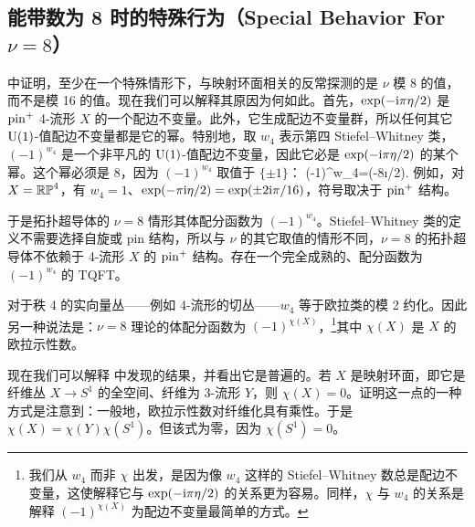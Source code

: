 
\subsection{能带数为 8 时的特殊行为（Special Behavior For $\nu=8$）}\label{zeb}

\cite{HCR} 中证明，至少在一个特殊情形下，与映射环面相关的反常探测的是 $\nu$ 模 8 的值，而不是模 16 的值。现在我们可以解释其原因为何如此。首先，$\exp(-{\mathrm i}\pi \eta/2)$ 是 ${\mathrm{pin}}^+$ 4-流形 $X$ 的一个配边不变量。此外，它生成配边不变量群，所以任何其它 ${\mathrm U}(1)$-值配边不变量都是它的幂。特别地，取 $w_4$ 表示第四 Stiefel--Whitney 类，$(-1)^{w_4}$ 是一个非平凡的 ${\mathrm U}(1)$-值配边不变量，因此它必是 $\exp(-{\mathrm i}\pi \eta/2)$ 的某个幂。这个幂必须是 8，因为 $(-1)^{w_4}$ 取值于 $\{\pm 1\}$：
\be\label{reffo}(-1)^{w_4}=\exp(-8\i\pi \eta/2). \ee
例如，对 $X={\mathbb{RP}}^4$，有 $w_4=1$、$\exp(-\pi {\mathrm i}\eta/2)=\exp(\pm 2{\mathrm i}\pi /16)$，符号取决于 ${\mathrm{pin}}^+$ 结构。


于是拓扑超导体的 $\nu=8$ 情形其体配分函数为 $(-1)^{w_4}$。Stiefel--Whitney 类的定义不需要选择自旋或 pin 结构，所以与 $\nu$ 的其它取值的情形不同，$\nu=8$ 的拓扑超导体不依赖于 4-流形 $X$ 的 ${\mathrm{pin}}^+$ 结构。存在一个完全成熟的、配分函数为 $(-1)^{w_4}$ 的 TQFT。

对于秩 4 的实向量丛——例如 4-流形的切丛——$w_4$ 等于欧拉类的模 2 约化。因此另一种说法是：$\nu=8$ 理论的体配分函数为 $(-1)^{\chi(X)}$，\footnote{我们从 $w_4$ 而非 $\chi$ 出发，是因为像 $w_4$ 这样的 Stiefel--Whitney 数总是配边不变量，这使解释它与 $\exp(-{\mathrm i}\pi \eta/2)$ 的关系更为容易。同样，$\chi$ 与 $w_4$ 的关系是解释 $(-1)^{\chi(X)}$ 为配边不变量最简单的方式。}其中 $\chi(X)$ 是 $X$ 的欧拉示性数。

现在我们可以解释 \cite{HCR} 中发现的结果，并看出它是普遍的。若 $X$ 是映射环面，即它是纤维丛 $X\to S^1$ 的全空间、纤维为 3-流形 $Y$，则 $\chi(X)=0$。证明这一点的一种方式是注意到：一般地，欧拉示性数对纤维化具有乘性。于是 $\chi(X)=\chi(Y)\chi(S^1)$。但该式为零，因为 $\chi(S^1)=0$。

